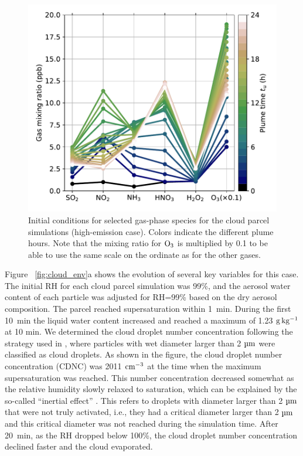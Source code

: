 \documentclass[edeposit,fullpage]{uiucthesis2009}
\begin{document}
 \begin{figure}
    \centering
    \includegraphics[scale=0.6]{chap3_figs/fig3.pdf}
    \caption{Initial conditions for selected gas-phase species
        for the cloud parcel simulations (high-emission case). Colors
        indicate the different plume hours. Note that the mixing ratio
        for $\rm O_3$ is multiplied by 0.1 to be able to use the same
        scale on the ordinate as for the other gases.}
    \label{fig:cases-gases}
\end{figure}

Figure ~\ref{fig:cloud_env}a shows the evolution of several key
variables for this case. The initial RH for each cloud parcel
  simulation was 99\%, and the aerosol water content of each particle
  was adjusted for RH=99\% based on the dry aerosol composition. The
  parcel reached supersaturation within 1~min. During the
first 10~min the liquid water content increased and reached a maximum
of 1.23 $\rm g \, kg^{-1}$ at 10 min. We determined the cloud droplet
number concentration following the strategy used in \citet{ching2012impacts},
where particles with wet diameter larger than 2 $\rm \mu m$ were
classified as cloud droplets. As shown in the figure, the cloud
droplet number concentration (CDNC) was 2011 $\rm cm^{-3}$ at the time
when the maximum supersaturation was reached. This number
concentration decreased somewhat as the relative humidity slowly
relaxed to saturation, which can be explained by the so-called
``inertial effect'' \citep{Chuang1997, Nenes2001}. This refers to
droplets with diameter larger than 2 $\rm \mu m$ that were not truly
activated, i.e., they had a critical diameter larger than 2 $\rm \mu
m$ and this critical diameter was not reached during the simulation
time.  After 20~min, as the RH dropped below 100\%, the cloud droplet
number concentration declined faster and the cloud evaporated.
\end{document}
